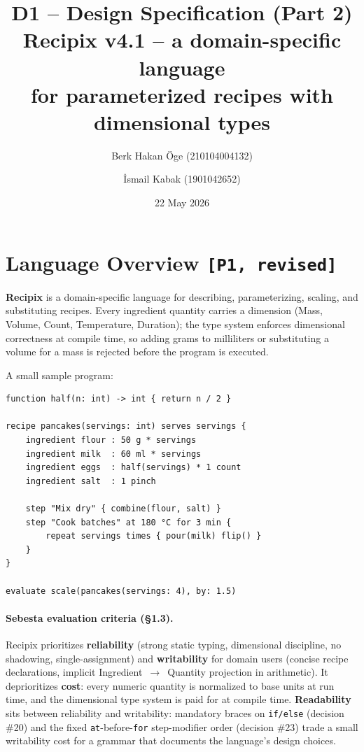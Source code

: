 \documentclass[11pt,a4paper]{article}
\title{\textbf{D1 -- Design Specification (Part 2)} \\
       \large Recipix v4.1 -- a domain-specific language \\
              for parameterized recipes with dimensional types}
\author{Berk Hakan \"Oge (210104004132) \and \.Ismail Kabak (1901042652)}
\date{22 May 2026}
\begin{document}
\maketitle
\thispagestyle{fancy}

\section{Language Overview \texttt{[P1, revised]}}

\textbf{Recipix} is a domain-specific language for describing,
parameterizing, scaling, and substituting recipes. Every ingredient
quantity carries a dimension (Mass, Volume, Count, Temperature, Duration);
the type system enforces dimensional correctness at compile time, so
adding grams to milliliters or substituting a volume for a mass is
rejected before the program is executed.

A small sample program:

\begin{lstlisting}
function half(n: int) -> int { return n / 2 }

recipe pancakes(servings: int) serves servings {
    ingredient flour : 50 g * servings
    ingredient milk  : 60 ml * servings
    ingredient eggs  : half(servings) * 1 count
    ingredient salt  : 1 pinch

    step "Mix dry" { combine(flour, salt) }
    step "Cook batches" at 180 °C for 3 min {
        repeat servings times { pour(milk) flip() }
    }
}

evaluate scale(pancakes(servings: 4), by: 1.5)
\end{lstlisting}

\paragraph{Sebesta evaluation criteria (\S1.3).} Recipix prioritizes
\textbf{reliability} (strong static typing, dimensional discipline,
no shadowing, single-assignment) and \textbf{writability} for
domain users (concise recipe declarations, implicit Ingredient~$\to$~Quantity
projection in arithmetic). It deprioritizes \textbf{cost}: every numeric
quantity is normalized to base units at run time, and the dimensional
type system is paid for at compile time. \textbf{Readability} sits between
reliability and writability: mandatory braces on \texttt{if/else} (decision
\#20) and the fixed \texttt{at}-before-\texttt{for} step-modifier order
(decision \#23) trade a small writability cost for a grammar that
documents the language's design choices.
\end{document}
